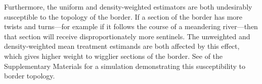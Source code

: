 Furthermore, the uniform and density-weighted estimators are both undesirably susceptible to the topology of the border.
If a section of the border has more twists and turns---for example if it follows the course of a meandering river---then that section will receive disproportionately more sentinels.
The unweighted and density-weighted mean treatment estimands are both affected by this effect,
which gives higher weight to wigglier sections of the border.
See  of the Supplementary Materials for a simulation demonstrating this susceptibility to border topology.




